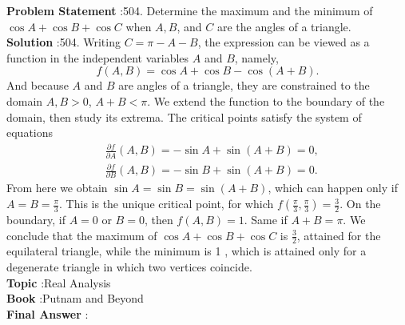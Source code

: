 \documentclass[10pt]{article}
\begin{document}
\textbf{Problem Statement} :504. Determine the maximum and the minimum of $\cos A+\cos B+\cos C$ when $A, B$, and $C$ are the angles of a triangle.\\
\textbf{Solution} :504. Writing $C=\pi-A-B$, the expression can be viewed as a function in the independent variables $A$ and $B$, namely,$$ f(A, B)=\cos A+\cos B-\cos (A+B) . $$And because $A$ and $B$ are angles of a triangle, they are constrained to the domain $A, B>0$, $A+B<\pi$. We extend the function to the boundary of the domain, then study its extrema. The critical points satisfy the system of equations $$ \begin{aligned} &\frac{\partial f}{\partial A}(A, B)=-\sin A+\sin (A+B)=0, \\ &\frac{\partial f}{\partial B}(A, B)=-\sin B+\sin (A+B)=0 . \end{aligned} $$From here we obtain $\sin A=\sin B=\sin (A+B)$, which can happen only if $A=B=\frac{\pi}{3}$. This is the unique critical point, for which $f\left(\frac{\pi}{3}, \frac{\pi}{3}\right)=\frac{3}{2}$. On the boundary, if $A=0$ or $B=0$, then $f(A, B)=1$. Same if $A+B=\pi$. We conclude that the maximum of $\cos A+\cos B+\cos C$ is $\frac{3}{2}$, attained for the equilateral triangle, while the minimum is 1 , which is attained only for a degenerate triangle in which two vertices coincide.\\
\textbf{Topic} :Real Analysis\\
\textbf{Book} :Putnam and Beyond\\
\textbf{Final Answer} :\\
\end{document}
